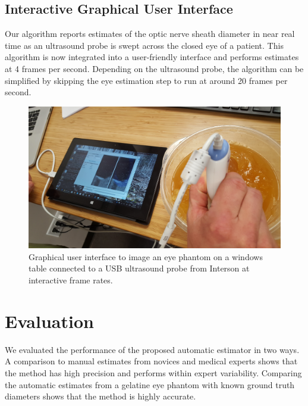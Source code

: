 \documentclass{llncs}
\begin{document}
\subsection{Interactive Graphical User Interface}
Our algorithm reports estimates of the optic nerve sheath diameter in near real
time as an ultrasound probe is swept across the closed eye of a patient.  This
algorithm is now integrated into a user-friendly interface and performs
estimates at 4 frames per second. Depending on the ultrasound probe, the
algorithm can be simplified by skipping the eye estimation step to run at around
20 frames per second. 
\begin{figure}
\centering
\includegraphics[width=0.75\linewidth]{gui.jpg} 
\caption{
\label{fig:gui}
Graphical user interface to image an eye phantom on a windows table connected to
a USB ultrasound probe from Interson at interactive frame rates. 
}
\end{figure}


\section{Evaluation}
We evaluated the performance of the proposed automatic estimator in two ways.
A comparison to manual estimates from novices and medical experts shows that the
method has high precision and performs within expert variability. Comparing the
automatic estimates from a gelatine eye phantom with known ground truth
diameters shows that the method is highly accurate. 
\end{document}
